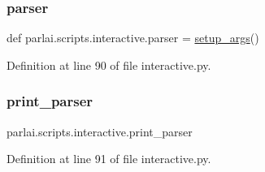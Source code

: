 \subsubsection{\texorpdfstring{parser}{parser}}
{\footnotesize\ttfamily def parlai.\+scripts.\+interactive.\+parser = \hyperlink{namespaceparlai_1_1scripts_1_1interactive_a873c4ae402aee061884a22139a5a442f}{setup\+\_\+args}()}



Definition at line 90 of file interactive.\+py.

\mbox{\label{namespaceparlai_1_1scripts_1_1interactive_a680885c6952e73c13d84a76689b5822d}} 
\subsubsection{\texorpdfstring{print\+\_\+parser}{print\_parser}}
{\footnotesize\ttfamily parlai.\+scripts.\+interactive.\+print\+\_\+parser}



Definition at line 91 of file interactive.\+py.

